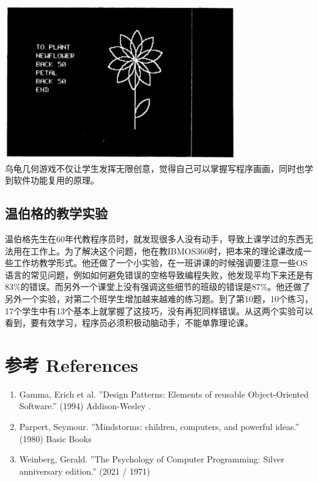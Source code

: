 \includegraphics[width=10cm]{mindstorm_p97.jpg}\\
乌龟几何游戏不仅让学生发挥无限创意，觉得自己可以掌握写程序画画，同时也学到软件功能复用的原理。

\hypertarget{ux6e29ux4f2fux683cux7684ux6559ux5b66ux5b9eux9a8c}{%
\subsection{温伯格的教学实验}\label{ux6e29ux4f2fux683cux7684ux6559ux5b66ux5b9eux9a8c}}

温伯格先生在60年代教程序员时，就发现很多人没有动手，导致上课学过的东西无法用在工作上。为了解决这个问题，他在教IBMOS360时，把本来的理论课改成一些工作坊教学形式。他还做了一个小实验，在一班讲课的时候强调要注意一些OS语言的常见问题，例如如何避免错误的空格导致编程失败，他发现平均下来还是有83\%的错误。而另外一个课堂上没有强调这些细节的班级的错误是87\%。他还做了另外一个实验，对第二个班学生增加越来越难的练习题。到了第10题，10个练习，17个学生中有13个基本上就掌握了这技巧，没有再犯同样错误。从这两个实验可以看到，要有效学习，程序员必须积极动脑动手，不能单靠理论课。


\hypertarget{ux9644ux4ef6}{%
\section{参考 References}\label{ux9644ux4ef6}}

\begin{enumerate}
\tightlist
\item
  Gamma, Erich et al. ''Design Patterns: Elements of reusable Object-Oriented Software.'' (1994) Addison-Wesley .\\
\item
  Parpert, Seymour. ''Mindstorms: children, computers, and powerful ideas.'' (1980) Basic Books \\
\item
  Weinberg, Gerald. ''The Psychology of Computer Programming: Silver anniversary edition.'' (2021 / 1971)\\
\end{enumerate}




